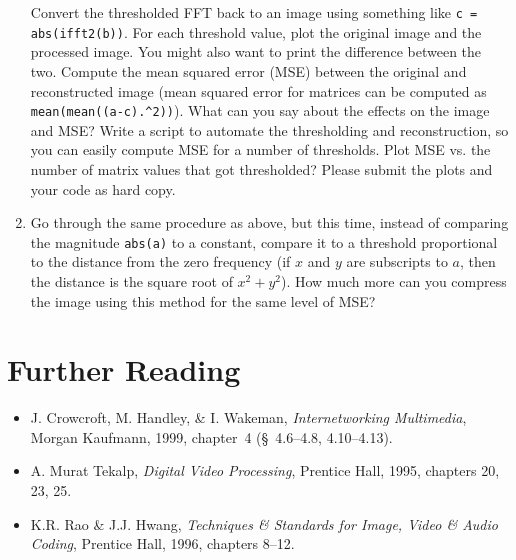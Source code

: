 \begin{enumerate}
Convert the thresholded FFT back to an image using something like
\verb|c = abs(ifft2(b))|. For each threshold value, plot the original
image and the processed image. You might also want to print the
difference between the two. Compute the mean squared error (MSE)
between the original and reconstructed image (mean squared error for
matrices can be computed as \verb|mean(mean((a-c).^2))|).  What can
you say about the effects on the image and MSE?  Write a script to
automate the thresholding and reconstruction, so you can easily
compute MSE for a number of thresholds. Plot MSE vs. the number of
matrix values that got thresholded?  Please submit the plots and your
code as hard copy.

\item Go through the same procedure as above, but this time, instead of 
comparing the magnitude \verb|abs(a)| to a constant, compare it to a
threshold proportional to the distance from the zero frequency (if $x$
and $y$ are subscripts to $a$, then the distance is the square root of
$x^2 + y^2$). How much more can you compress the image using this
method for the same level of MSE?
\end{enumerate}

\section{Further Reading}

\begin{itemize}
\item J. Crowcroft, M. Handley, \& I. Wakeman, \textit{Internetworking
    Multimedia}, Morgan Kaufmann, 1999, chapter~4 (\S\ 4.6--4.8,
  4.10--4.13).
\item A. Murat Tekalp, \textit{Digital Video Processing}, Prentice
  Hall, 1995, chapters 20, 23, 25.
\item K.R. Rao \& J.J. Hwang, \textit{Techniques \& Standards for
    Image, Video \& Audio Coding}, Prentice Hall, 1996, chapters
  8--12.
\end{itemize}

